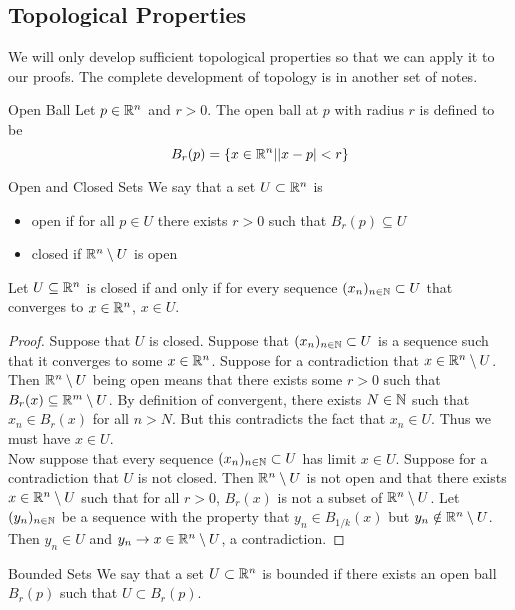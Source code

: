 \documentclass[a4paper]{article}
\begin{document}
\subsection{Topological Properties}
We will only develop sufficient topological properties so that we can apply it to our proofs. The complete development of topology is in another set of notes. 

\begin{defn}{Open Ball}{} Let $p\in\mathbb{R}^n$ and $r>0$. The open ball at $p$ with radius $r$ is defined to be $$B_r(p)=\{x\in\mathbb{R}^n|\abs{x-p}<r\}$$
\end{defn}

\begin{defn}{Open and Closed Sets}{} We say that a set $U\subset\mathbb{R}^n$ is 
\begin{itemize}
\item open if for all $p\in U$ there exists $r>0$ such that $B_r(p)\subseteq U$
\item closed if $\mathbb{R}^n\setminus U$ is open
\end{itemize}
\end{defn}

\begin{prp}{}{} Let $U\subseteq\mathbb{R}^n$ is closed if and only if for every sequence $(x_n)_{n\in\mathbb{N}}\subset U$ that converges to $x\in\mathbb{R}^n$, $x\in U$. 
\begin{proof}
Suppose that $U$ is closed. Suppose that $(x_n)_{n\in\mathbb{N}}\subset U$ is a sequence such that it converges to some $x\in\mathbb{R}^n$. Suppose for a contradiction that $x\in\mathbb{R}^n\setminus U$. Then $\mathbb{R}^n\setminus U$ being open means that there exists some $r>0$ such that $B_r(x)\subseteq\mathbb{R}^m\setminus U$. By definition of convergent, there exists $N\in\mathbb{N}$ such that $x_n\in B_r(x)$ for all $n>N$. But this contradicts the fact that $x_n\in U$. Thus we must have $x\in U$. \\
Now suppose that every sequence $(x_n)_{n\in\mathbb{N}}\subset U$ has limit $x\in U$. Suppose for a contradiction that $U$ is not closed. Then $\mathbb{R}^n\setminus U$ is not open and that there exists $x\in\mathbb{R}^n\setminus U$ such that for all $r>0$, $B_r(x)$ is not a subset of $\mathbb{R}^n\setminus U$. Let $(y_n)_{n\in\mathbb{N}}$ be a sequence with the property that $y_n\in B_{1/k}(x)$ but $y_n\notin\mathbb{R}^n\setminus U$. Then $y_n\in U$ and $y_n\to x\in\mathbb{R}^n\setminus U$, a contradiction. 
\end{proof}
\end{prp}

\begin{defn}{Bounded Sets}{} We say that a set $U\subset\mathbb{R}^n$ is bounded if there exists an open ball $B_r(p)$ such that $U\subset B_r(p)$. 
\end{defn}
\end{document}
